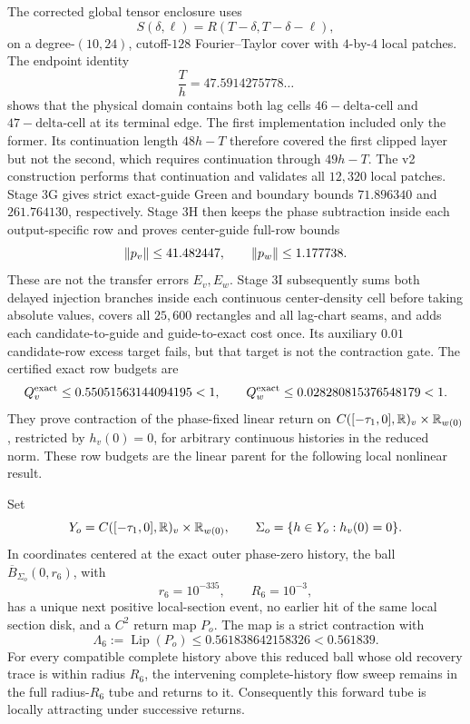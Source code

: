 The corrected global tensor enclosure uses
\[
 S(\delta,\ell)=R(T-\delta,T-\delta-\ell),
\]
on a degree-\((10,24)\), cutoff-\(128\) Fourier--Taylor cover with
\(4\)-by-\(4\) local patches.  The endpoint identity
\[
 \frac{T}{h}=47.5914275778\ldots
\]
shows that the physical domain contains both lag cells
\(46-\text{delta-cell}\) and \(47-\text{delta-cell}\) at its terminal edge.
The first implementation included only the former.  Its continuation length
\(48h-T\) therefore covered the first clipped layer but not the second,
which requires continuation through \(49h-T\).  The v2 construction performs
that continuation and validates all \(12{,}320\) local patches.  Stage 3G
gives strict exact-guide Green and boundary bounds \(71.896340\) and
\(261.764130\), respectively.  Stage 3H then keeps the phase subtraction
inside each output-specific row and proves center-guide full-row bounds
\begin{equation}
 \left\lVert p_v\right\rVert\le41.482447,
 \qquad \left\lVert p_w\right\rVert\le1.177738.                         \label{eq:stage3h-row-sizes}
\end{equation}
These are not the transfer errors \(E_v,E_w\).  Stage 3I subsequently sums
both delayed injection branches inside each continuous center-density cell
before taking absolute values, covers all \(25{,}600\) rectangles and all
lag-chart seams, and adds each candidate-to-guide and guide-to-exact cost
once.  Its auxiliary \(0.01\) candidate-row excess target fails, but that
target is not the contraction gate.  The certified exact row budgets are
\begin{equation}
 Q_v^{\rm exact}\le0.55051563144094195<1,
 \qquad
 Q_w^{\rm exact}\le0.028280815376548179<1.             \label{eq:stage3i-row-budgets}
\end{equation}
They prove contraction of the phase-fixed linear return on
\(C([-\tau_1,0],\mathbb R)_v\times\mathbb R_{w(0)}\), restricted by \(h_v(0)=0\), for
arbitrary continuous histories in the reduced norm.  These row budgets are
the linear parent for the following local nonlinear result.

\begin{theorem}
\label{thm:outer-nonlinear-local-tube}
Set
\[
 Y_o=C([-\tau_1,0],\mathbb R)_v\times\mathbb R_{w(0)},
 \qquad \Sigma_o=\{h\in Y_o:h_v(0)=0\}.
\]
In coordinates centered at the exact outer phase-zero history, the ball
\(\overline B_{\Sigma_o}(0,r_6)\), with
\[
 r_6=10^{-335},\qquad R_6=10^{-3},
\]
has a unique next positive local-section event, no earlier hit of the same
local section disk, and a \(C^2\) return map \(P_o\).  The map is a strict
contraction with
\begin{equation}
 \Lambda_6:=\operatorname{Lip}(P_o)
 \le0.561838642158326<0.561839.                         \label{eq:stage6a-lipschitz}
\end{equation}
For every compatible complete history above this reduced ball whose old
recovery trace is within radius \(R_6\), the intervening complete-history
flow sweep remains in the full radius-\(R_6\) tube and returns to it.
Consequently this forward tube is locally attracting under successive
returns.
\end{theorem}


